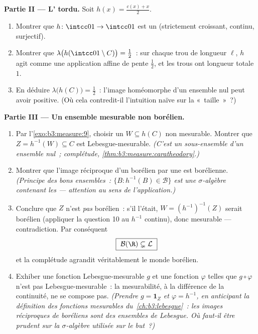 \begin{problem}
\medskip
\noindent\textbf{Partie II --- L' tordu.} Soit
$h(x) = \frac{c(x) + x}{2}$.
\begin{enumerate}[resume]
  \item Montrer que $h \colon \intcc01 \to \intcc01$ est un
         (strictement croissant, continu,
        surjectif).
  \item Montrer que $\lambda\bigl(h(\intcc01\setminus C)\bigr)
        = \tfrac12$~: sur chaque trou de longueur $\ell$, $h$
        agit comme une application affine de pente
        $\tfrac12$, et les trous ont longueur totale $1$.
  \item En déduire $\lambda\bigl(h(C)\bigr) = \tfrac12$~:
        l'image homéomorphe d'un ensemble nul peut avoir
         positive. (Où cela contredit-il l'intuition
        naïve sur la «~taille~»~?)
\end{enumerate}

\medskip
\noindent\textbf{Partie III --- Un ensemble mesurable non
borélien.}
\begin{enumerate}[resume]
  \item Par l'\cref{exo:b3:measure:9}, choisir un $W
        \subseteq h(C)$ non mesurable. Montrer que $Z =
        h^{-1}(W) \subseteq C$ est Lebesgue-mesurable.
        \emph{(C'est un sous-ensemble d'un ensemble nul~;
        complétude, \cref{thm:b3:measure:caratheodory}.)}
  \item Montrer que l'image réciproque d'un borélien par une
         est borélienne. \emph{(Principe
        des bons ensembles~: $\{B : h^{-1}(B) \in \mathcal
        B\}$ est une $\sigma$-algèbre contenant les 
        --- attention au sens de l'application.)}
  \item Conclure que $Z$ n'est \emph{pas} borélien~: s'il
        l'était, $W = (h^{-1})^{-1}(Z)$ serait borélien
        (appliquer la question 10 au $h^{-1}$ continu), donc
        mesurable --- contradiction. Par conséquent
        \[
        \boxed{\ \mathcal B(\R) \subsetneq \mathcal L\ }
        \]
        et la complétude agrandit véritablement le monde
        borélien.
  \item Exhiber une fonction Lebesgue-mesurable $g$ et une
        fonction  $\varphi$ telles que $g \circ
        \varphi$ n'est pas Lebesgue-mesurable~: la
        mesurabilité, à la différence de la continuité, ne se
        compose pas. \emph{(Prendre $g = \mathbf 1_Z$ et
        $\varphi = h^{-1}$, en anticipant la définition des
        fonctions mesurables du~\cref{ch:b3:lebesgue}~: les
        images réciproques de boréliens sont des ensembles de
        Lebesgue. Où faut-il être prudent sur la
        $\sigma$-algèbre utilisée sur le but~?)}
\end{enumerate}


\end{problem}
